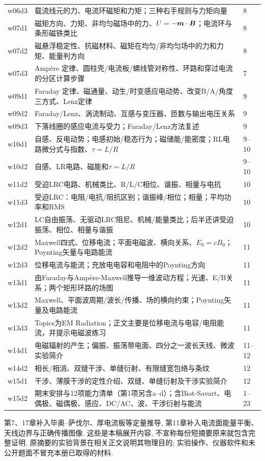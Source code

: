 \begin{longtable}{p{.13\linewidth}p{.68\linewidth}p{.10\linewidth}}
w06d3 & 载流线元的力、电流环磁矩和力矩；三种右手规则与力矩向量 & 8\\
w07d1 & 磁矩方向、力矩、非均匀磁场中的力、$U=-\boldsymbol{m}\cdot\boldsymbol{B}$；电流环与条形磁铁类比 & 8\\
w07d2 & 磁悬浮稳定性、抗磁材料、磁矩在均匀/非均匀场中的力和力矩、能量判方向 & 8\\
w07d3 & Ampère 定律、圆柱壳/电流板/螺线管对称性、环路和穿过电流的分区计算步骤 & 7\\
w09d1 & Faraday 定律、磁通量、动生/时变感应电动势、改变B/A/角度三方式、Lenz定律 & 9\\
w09d2 & Faraday/Lenz、涡流制动、互感与变压器、匝数与输出电压关系 & 9\\
w09d3 & 下落线圈的感应电流与受力；Faraday/Lenz方法复述 & 9\\
w10d1 & 自感、反电动势；电感初始/稳态行为；磁储能/能密度；RL电路微分式与指数、$\tau=L/R$ & 9--10\\
w10d2 & 自感、LR电路、磁能和$\tau=L/R$ & 9--10\\
w11d2 & 受迫LRC电路、机械类比、R/L/C相位、谐振、相量与电抗 & 10\\
w11d3 & 受迫LRC：电阻/电抗/阻抗区别；谐振峰/相位；相量；平均功率和RMS & 10\\
w12d1 & LC自由振荡、无驱动LRC阻尼、机械/能量类比；后半还讲受迫振荡、相位、相量与谐振 & 10\\
w12d2 & Maxwell四式、位移电流；平面电磁波、横向关系、$E_0=cB_0$；Poynting矢量与电路能流 & 11\\
w12d3 & 位移电流与能流；充放电电容和电阻中的Poynting方向 & 11\\
w13d1 & 由Faraday与Ampère-Maxwell推导一维波动方程；光速、E/B关系；两个矩形环路的场图 & 11\\
w13d2 & Maxwell、平面波周期/波长/传播、场的横向约束；Poynting矢量及电路能流 & 11\\
w13d3 & Topics为EM Radiation；正文主要是位移电流与电容/电阻能流，并提示电磁波练习 & 11\\
w14d1 & 电磁辐射的产生；偏振、振荡带电面、四分之一波长天线、微波实验简介 & 11--12\\
w14d2 & 相长/相消、双缝干涉、单缝衍射、有限缝宽包络与条纹 & 12\\
w15d1 & 干涉、薄膜干涉的定性介绍、双缝、单缝衍射及干涉实验简介 & 12\\
w15d2 & 期末安排与12项能力清单（第1项另含a–d）；含Biot-Savart、电偶极、磁偶极、感应、DC/AC、波、干涉衍射与能流 & 1--23\\
\bottomrule\end{longtable}
第7、17章补入毕奥--萨伐尔、厚电流板等定量推导, 第11章补入电流面能量平衡、天线边界与正确传播图像. 这些是本稿展开内容, 不宣称每份短摘要原来就包含完整证明. 原摘要的实验背景在相关正文说明其物理目的; 实验操作、仪器软件和未公开题面不冒充本册已取得的材料.

